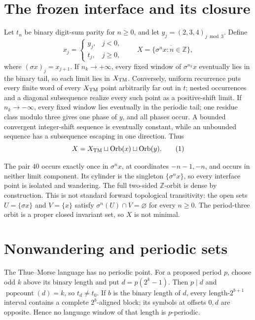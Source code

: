 \documentclass[10pt]{article}
\begin{document}
\section{The frozen interface and its closure}
Let $t_n$ be binary digit-sum parity for $n\geq0$, and let
$y_j=(2,3,4)_{j\bmod3}$.  Define
\[
x_j=\begin{cases}y_j,&j<0,\\t_j,&j\geq0,\end{cases}
\qquad X=\overline{\{\sigma^n x:n\in\mathbb Z\}},
\]
where $(\sigma x)_j=x_{j+1}$.  If $n_k\to+\infty$, every fixed window of
$\sigma^{n_k}x$ eventually lies in the binary tail, so each limit lies in
$X_{\rm TM}$.  Conversely, uniform recurrence puts every finite word of
every $X_{\rm TM}$ point arbitrarily far out in $t$; nested occurrences and
a diagonal subsequence realize every such point as a positive-shift limit.
If $n_k\to-\infty$, every fixed window lies eventually in the periodic tail;
one residue class modulo three gives one phase of $y$, and all phases occur.
A bounded convergent integer-shift sequence is eventually constant, while an
unbounded sequence has a subsequence escaping in one direction.  Thus
\begin{equation}
X=X_{\rm TM}\sqcup\operatorname{Orb}(x)\sqcup\operatorname{Orb}(y).
\tag{1}
\end{equation}

The pair $40$ occurs exactly once in $\sigma^n x$, at coordinates
$-n-1,-n$, and occurs in neither limit component.  Its cylinder is the
singleton $\{\sigma^n x\}$, so every interface point is isolated and
wandering.  The full two-sided $\mathbb Z$-orbit is dense by construction.
This is not standard forward topological transitivity: the open sets
$U=\{\sigma x\}$ and $V=\{x\}$ satisfy
$\sigma^n(U)\cap V=\varnothing$ for every $n\geq0$.  The period-three orbit
is a proper closed invariant set, so $X$ is not minimal.

\section{Nonwandering and periodic sets}
The Thue--Morse language has no periodic point.  For a proposed period $p$,
choose odd $k$ above its binary length and put $d=p(2^k-1)$.  Then $p\mid d$
and $\operatorname{popcount}(d)=k$, so $t_d\ne t_0$.  If $b$ is the binary
length of $d$, every length-$2^{b+1}$ interval contains a complete
$2^b$-aligned block; its symbols at offsets $0,d$ are opposite.  Hence no
language window of that length is $p$-periodic.
\end{document}
